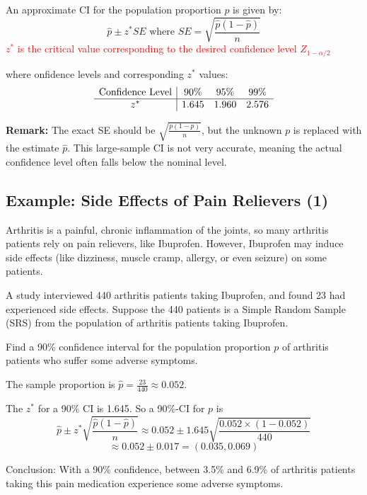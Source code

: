 \documentclass[14pt]{extarticle}
\begin{document}
An approximate CI for the population proportion \( p \) is given by:
\[
\hat{p} \pm z^* SE \text{ where } SE = \sqrt{\frac{\hat{p}(1 - \hat{p})}{n}}
\]
\textcolor{red}{\( z^* \) is the critical value corresponding to the desired confidence level $Z_{1-\alpha/2}$ }

\noindent where onfidence levels and corresponding \( z^* \) values:
\[
\begin{array}{c|c c c}
\text{Confidence Level} & 90\% & 95\% & 99\% \\
\hline
z^* & 1.645 & 1.960 & 2.576 \\
\end{array}
\]

\noindent \textbf{Remark:} The exact SE should be \( \sqrt{\frac{p(1 - p)}{n}} \), but the unknown \( p \) is replaced with the estimate \( \hat{p} \). This large-sample CI is not very accurate, meaning the actual confidence level often falls below the nominal level.

\subsection*{Example: Side Effects of Pain Relievers (1)}

Arthritis is a painful, chronic inflammation of the joints, so many arthritis patients rely on pain relievers, like Ibuprofen. However, Ibuprofen may induce side effects (like dizziness, muscle cramp, allergy, or even seizure) on some patients.

\noindent A study interviewed 440 arthritis patients taking Ibuprofen, and found 23 had experienced side effects. Suppose the 440 patients is a Simple Random Sample (SRS) from the population of arthritis patients taking Ibuprofen.

\noindent Find a 90\% confidence interval for the population proportion \( p \) of arthritis patients who suffer some adverse symptoms.
\vspace{0.5cm}

The sample proportion is \(\hat{p} = \frac{23}{440} \approx 0.052\).

The \(z^*\) for a 90\% CI is 1.645. So a 90\%-CI for \(p\) is
\[
\hat{p} \pm z^* \sqrt{\frac{\hat{p}(1 - \hat{p})}{n}} \approx 0.052 \pm 1.645 \sqrt{\frac{0.052 \times (1 - 0.052)}{440}}
\]
\[
\approx 0.052 \pm 0.017 = (0.035, 0.069)
\]

Conclusion: With a 90\% confidence, between 3.5\% and 6.9\% of arthritis patients taking this pain medication experience some adverse symptoms.
\end{document}
